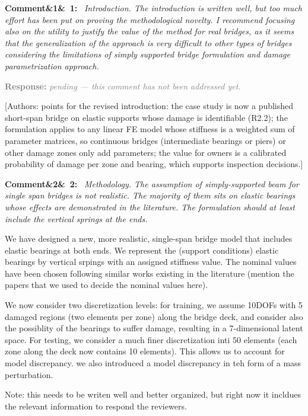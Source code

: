 \documentclass[11pt]{article}
\newenvironment{rcomment}[1]{\par\bigskip\noindent\textbf{Comment\ifx&#1&\else\ #1\fi:}\ \itshape}{\par}
\newcommand{\pending}{\par\smallskip\noindent\textcolor{gray}{\textbf{Response:} \textit{pending --- this comment
has not been addressed yet.}}\par}
\newcommand{\authornote}[1]{\textcolor{note}{\textsf{[Authors: #1]}}}
\begin{document}
\begin{rcomment}{1}
Introduction. The introduction is written well, but too much effort has been put on proving the methodological novelty. I recommend focusing also on the utility to justify the value of the method for real bridges, as it seems that the generalization of the approach is very difficult to other types of bridges considering the limitations of simply
supported bridge formulation and damage parametrization approach.
\end{rcomment}
\pending
\authornote{points for the revised introduction: the case study is now a published short-span bridge on elastic supports
whose damage is identifiable (R2.2); the formulation applies to any linear FE model whose stiffness is a weighted sum of
parameter matrices, so continuous bridges (intermediate bearings or piers) or other damage zones only add parameters;
the value for owners is a calibrated probability of damage per zone and bearing, which supports inspection
decisions.}

\begin{rcomment}{2}
Methodology. The assumption of simply-supported beam for single span bridges is not realistic. 
The majority of them sits on elastic bearings whose effects are demonstrated in the literature. 
The formulation should at least include the vertical springs at the ends.
\end{rcomment}
We have designed a new, more realistic, single-span bridge model that includes elastic bearings at both ends. 
We represent the (support conditions) elastic bearings by vertical srpings with an assigned stiffness value.  
The nominal values have been chosen following similar works existing in the literature (mention the papers that we used to decide the nominal values here). 

We now consider two discretization levels: 
for training, we assume 10DOFs with 5 damaged regions (two elements per zone) along the bridge deck, and consider also the possiblity of the bearings to suffer damage, resulting in a 7-dimensional latent space. 
For testing, we consider a much finer discretization inti 50 elements (each zone along the deck now contains 10 elements). This allows us to account for model discrepancy. we also introduced a model discrepancy in teh form of a mass perturbation.

Note: this needs to be writen well and better organized, but right now it incldues the relevant information to respond the reviewers. 
\end{document}
